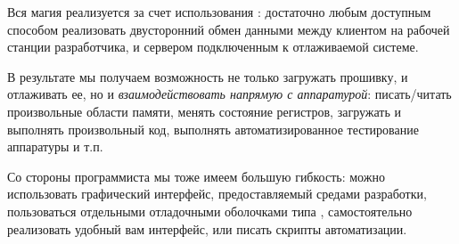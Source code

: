 Вся магия  реализуется за счет использования
: достаточно любым доступным способом
реализовать двусторонний обмен данными между клиентом на рабочей станции
разработчика, и сервером подключенным к отлаживаемой системе.

В результате мы получаем возможность не только загружать прошивку, и отлаживать
ее, но и \emph{взаимодействовать напрямую с аппаратурой}: писать/читать
произвольные области памяти, менять состояние регистров, загружать и выполнять
произвольный код, выполнять автоматизированное тестирование аппаратуры и т.п.

\bigskip
Со стороны программиста мы тоже имеем большую гибкость: можно использовать
графический интерфейс, предоставляемый средами разработки, пользоваться
отдельными отладочными оболочками типа , самостоятельно
реализовать удобный вам интерфейс, или писать скрипты автоматизации.

\secup
